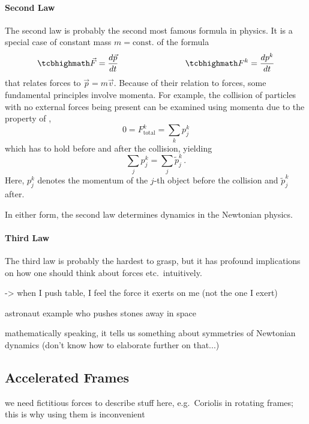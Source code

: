 			\paragraph{Second Law}
The second law is probably the second most famous formula in physics. It is a special case of constant mass $m = \text{const.}$ of the formula
\begin{equation}\label{eq:newton_2}
	\eqbox{
	\vec{F} = \dv{\vec{p}}{t}
	}
	\manyqquad
	\eqbox{
	F^k = \dv{p^k}{t}
	}
\end{equation}
that relates forces to  $\vec{p} = m \vec{v}$. Because of their relation to forces, some fundamental principles involve momenta. For example, the collision of particles with no external forces being present can be examined using momenta due to the property of ,
\begin{equation}\label{eq:momentum_conservation}
	0 = F_\text{total}^k = \sum_k p_j^k
\end{equation}
which has to hold before and after the collision, yielding
\begin{equation}\label{eq:implication_momentum_conservation}
	\sum_j p_j^k = \sum_j \tilde{p}_j^k \, .
\end{equation}
Here, $p_j^k$ denotes the momentum of the $j$-th object before the collision and $\tilde{p}_j^k$ after.


In either form, the second law determines dynamics in the Newtonian physics.



			\paragraph{Third Law}
The third law is probably the hardest to grasp, but it has profound implications on how one should think about forces etc.~intuitively.

-> when I push table, I feel the force it exerts on me (not the one I exert)


\begin{ex}
astronaut example who pushes stones away in space
\end{ex}


mathematically speaking, it tells us something about symmetries of Newtonian dynamics (don't know how to elaborate further on that...)



\iffalse
	\subsection{Accelerated Frames}
we need fictitious forces to describe stuff here, e.g.~Coriolis in rotating frames; this is why using them is inconvenient



